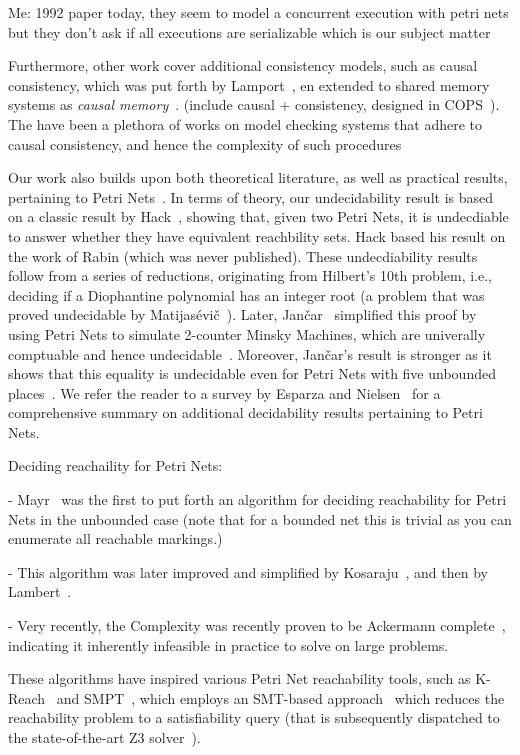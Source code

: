 Me:
1992 paper today, they seem to model a concurrent execution with petri nets but they don't ask if all executions are serializable which is our subject matter

Furthermore, other work cover additional consistency models, such as causal consistency, which was put forth by Lamport~\cite{La78}, en extended to shared memory systems as \textit{causal memory}~\cite{AhNeBuKoHu95}. (include causal + consistency, designed in COPS~\cite{LlFrKaAn11}). The have been a plethora of works on model checking systems that adhere to causal consistency, and hence the complexity of such procedures~\cite{BoEnGuHa17,ZeBiBoEnEr19,LaBo20}





Our work also builds upon both theoretical literature, as well as practical results, pertaining to Petri Nets~\cite{Reisig12,Mu89}.
%
In terms of theory, our undecidability result is based on a classic result by Hack~\cite{Ha76}, showing that, given two Petri Nets, it is undecdiable to answer whether they have equivalent reachbility sets. Hack based his result on the work of Rabin (which was never published). These undecdiability results follow from a series of reductions, originating from Hilbert's 10th problem, i.e., deciding if a Diophantine polynomial has an integer root (a problem that was proved undecidable by Matijas{\'e}vi{\v{c}}~\cite{Ma70}).
%
Later, Jan{\v{c}}ar~\cite{Ja95} simplified this proof by using Petri Nets to simulate 2-counter Minsky Machines, which are univerally comptuable and hence undecidable~\cite{Mi67}. Moreover, Jan{\v{c}}ar's result is stronger as it shows that this equality is undecidable even for Petri Nets with five unbounded places~\cite{Ja95}.
%
We refer the reader to a survey by Esparza and Nielsen~\cite{EsNi94} for a comprehensive summary on additional decidability results pertaining to Petri Nets.


Deciding reachaility for Petri Nets:

- Mayr~\cite{Ma81} was the first to put forth an algorithm for deciding reachability for Petri Nets in the unbounded case (note that for a bounded net this is trivial as you can enumerate all reachable markings.)

- This algorithm was later improved and simplified by Kosaraju~\cite{Ko82}, and then by Lambert~\cite{La92}.

- Very recently, the Complexity was recently proven to be Ackermann complete~\cite{CzWo22}, indicating it inherently infeasible in practice to solve on large problems.

These algorithms have inspired various Petri Net reachability tools, such as K-Reach~\cite{DiLa20} and SMPT~\cite{AmDa23}, which employs an SMT-based approach~\cite{AmBeDa21, AmDaHu22} which reduces the reachability problem to a satisfiability query (that is subsequently dispatched to the state-of-the-art Z3 solver~\cite{DeBj08}).

 

